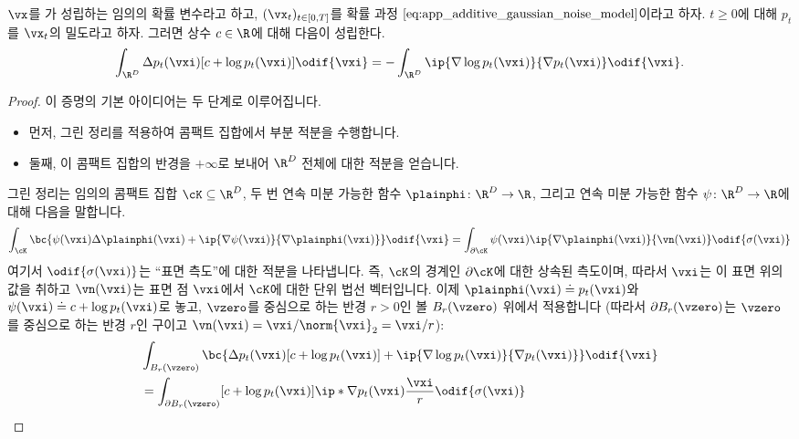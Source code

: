 \documentclass[../../book-main_ko.tex]{subfiles}
\begin{document}
\begin{lemma}\label{lem:diffusion_ibp}
    \(\vx\)를 가 성립하는 임의의 확률 변수라고 하고, \((\vx_{t})_{t \in [0, T]}\)를 확률 과정 \(\eqref{eq:app_additive_gaussian_noise_model}\)이라고 하자. \(t \geq 0\)에 대해 \(p_{t}\)를 \(\vx_{t}\)의 밀도라고 하자. 그러면 상수 \(c \in \R\)에 대해 다음이 성립한다.
    \begin{equation}
        \int_{\R^{D}}\Delta p_{t}(\vxi)[c + \log p_{t}(\vxi)]\odif{\vxi} = -\int_{\R^{D}}\ip{\nabla \log p_{t}(\vxi)}{\nabla p_{t}(\vxi)}\odif{\vxi}.
    \end{equation}
\end{lemma}
\begin{proof}
    이 증명의 기본 아이디어는 두 단계로 이루어집니다.
    \begin{itemize}
        \item 먼저, 그린 정리를 적용하여 콤팩트 집합에서 부분 적분을 수행합니다.
        \item 둘째, 이 콤팩트 집합의 반경을 \(+\infty\)로 보내어 \(\R^{D}\) 전체에 대한 적분을 얻습니다.
    \end{itemize}
    그린 정리는 임의의 콤팩트 집합 \(\cK \subseteq \R^{D}\), 두 번 연속 미분 가능한 함수 \(\plainphi \colon \R^{D} \to \R\), 그리고 연속 미분 가능한 함수 \(\psi \colon \R^{D} \to \R\)에 대해 다음을 말합니다.
    \begin{equation}
        \int_{\cK}\bc{\psi(\vxi) \Delta \plainphi(\vxi) + \ip{\nabla \psi(\vxi)}{\nabla \plainphi(\vxi)}}\odif{\vxi} = \int_{\partial \cK}\psi(\vxi)\ip{\nabla \plainphi(\vxi)}{\vn(\vxi)}\odif{\sigma(\vxi)}
    \end{equation}
    여기서 \(\odif{\sigma(\vxi)}\)는 ``표면 측도''에 대한 적분을 나타냅니다. 즉, \(\cK\)의 경계인 \(\partial \cK\)에 대한 상속된 측도이며, 따라서 \(\vxi\)는 이 표면 위의 값을 취하고 \(\vn(\vxi)\)는 표면 점 \(\vxi\)에서 \(\cK\)에 대한 단위 법선 벡터입니다. 이제 \(\plainphi(\vxi) \doteq p_{t}(\vxi)\)와 \(\psi(\vxi) \doteq c + \log p_{t}(\vxi)\)로 놓고, \(\vzero\)를 중심으로 하는 반경 \(r > 0\)인 볼 \(B_{r}(\vzero)\) 위에서 적용합니다 (따라서 \(\partial B_{r}(\vzero)\)는 \(\vzero\)를 중심으로 하는 반경 \(r\)인 구이고 \(\vn(\vxi) = \vxi/\norm{\vxi}_{2} = \vxi/r\)):
    \begin{align}
        &\int_{B_{r}(\vzero)}\bc{\Delta p_{t}(\vxi)[c + \log p_{t}(\vxi)] + \ip{\nabla \log p_{t}(\vxi)}{\nabla p_{t}(\vxi)}}\odif{\vxi} \\
        &= \int_{\partial B_{r}(\vzero)}[c + \log p_{t}(\vxi)]\ip*{\nabla p_{t}(\vxi)}{\frac{\vxi}{r}}\odif{\sigma(\vxi)} \\

\end{align}
\end{proof}
\end{document}
